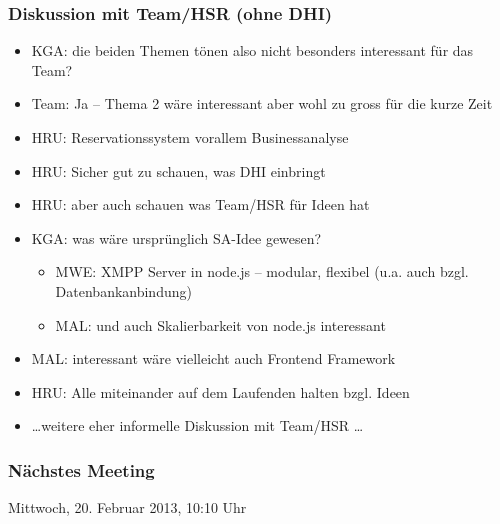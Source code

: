\subsubsection*{Diskussion mit Team/HSR (ohne DHI)}
\begin{itemize}
\item KGA: die beiden Themen tönen also nicht besonders interessant für das Team?
\item Team: Ja -- Thema 2 wäre interessant aber wohl zu gross für die kurze Zeit
\item HRU: Reservationssystem vorallem Businessanalyse
\item HRU: Sicher gut zu schauen, was DHI einbringt
\item HRU: aber auch schauen was Team/HSR für Ideen hat
\item KGA: was wäre ursprünglich SA-Idee gewesen?
\begin{itemize}
	\item MWE: XMPP Server in node.js -- modular, flexibel (u.a. auch bzgl. Datenbankanbindung)
	\item MAL: und auch Skalierbarkeit von node.js interessant
\end{itemize}
\item MAL: interessant wäre vielleicht auch Frontend Framework
\item HRU: Alle miteinander auf dem Laufenden halten bzgl. Ideen
\item \ldots weitere eher informelle Diskussion mit Team/HSR \ldots
\end{itemize}

\subsubsection*{Nächstes Meeting}

Mittwoch, 20. Februar 2013, 10:10 Uhr